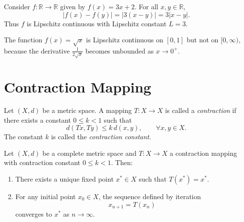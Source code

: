 \begin{example}
    Consider $f:\mathbb{R}\to \mathbb{R}$ given by $f(x) = 3x + 2$.  
    For all $x,y \in \mathbb{R}$,
    \begin{equation}
        |f(x)-f(y)| = |3(x-y)| = 3|x-y|.
    \end{equation}
    Thus $f$ is Lipschitz continuous with Lipschitz constant $L=3$.
\end{example}

\begin{example}
    The function $f(x) = \sqrt{x}$ is Lipschitz continuous on $[0,1]$ but not on $[0,\infty)$, because the derivative $\frac{1}{2\sqrt{x}}$ becomes unbounded as $x \to 0^+$.
\end{example}

\section{Contraction Mapping}

\begin{definition}
    Let $(X,d)$ be a metric space.  
    A mapping $T: X \to X$ is called a \emph{contraction} if there exists a constant $0 \leq k < 1$ such that
    \begin{equation}
        d(Tx,Ty) \leq k \, d(x,y), \qquad \forall x,y \in X.
    \end{equation}
    The constant $k$ is called the \emph{contraction constant}.
\end{definition}


\begin{theorem}
    Let $(X,d)$ be a complete metric space and $T:X \to X$ a contraction mapping with contraction constant $0 \leq k < 1$.  
    Then:
    \begin{enumerate}
        \item There exists a unique fixed point $x^* \in X$ such that $T(x^*) = x^*$.
        \item For any initial point $x_0 \in X$, the sequence defined by iteration
        \begin{equation}
            x_{n+1} = T(x_n)
        \end{equation}
        converges to $x^*$ as $n \to \infty$.
    \end{enumerate}
\end{theorem}

